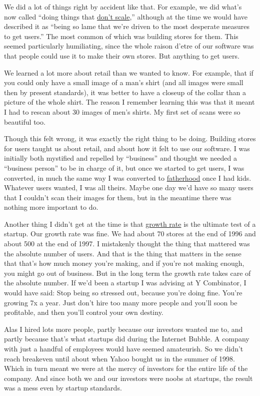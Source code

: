 We did a lot of things right by accident like that. For example, we did
what's now called ``doing things that \href{ds.html}{don't scale},''
although at the time we would have described it as ``being so lame that
we're driven to the most desperate measures to get users.'' The most
common of which was building stores for them. This seemed particularly
humiliating, since the whole raison d'etre of our software was that
people could use it to make their own stores. But anything to get users.

We learned a lot more about retail than we wanted to know. For example,
that if you could only have a small image of a man's shirt (and all
images were small then by present standards), it was better to have a
closeup of the collar than a picture of the whole shirt. The reason I
remember learning this was that it meant I had to rescan about 30 images
of men's shirts. My first set of scans were so beautiful too.

Though this felt wrong, it was exactly the right thing to be doing.
Building stores for users taught us about retail, and about how it felt
to use our software. I was initially both mystified and repelled by
``business'' and thought we needed a ``business person'' to be in charge
of it, but once we started to get users, I was converted, in much the
same way I was converted to \href{kids.html}{fatherhood} once I had
kids. Whatever users wanted, I was all theirs. Maybe one day we'd have
so many users that I couldn't scan their images for them, but in the
meantime there was nothing more important to do.

Another thing I didn't get at the time is that \href{growth.html}{growth
rate} is the ultimate test of a startup. Our growth rate was fine. We
had about 70 stores at the end of 1996 and about 500 at the end of 1997.
I mistakenly thought the thing that mattered was the absolute number of
users. And that is the thing that matters in the sense that that's how
much money you're making, and if you're not making enough, you might go
out of business. But in the long term the growth rate takes care of the
absolute number. If we'd been a startup I was advising at Y Combinator,
I would have said: Stop being so stressed out, because you're doing
fine. You're growing 7x a year. Just don't hire too many more people and
you'll soon be profitable, and then you'll control your own destiny.

Alas I hired lots more people, partly because our investors wanted me
to, and partly because that's what startups did during the Internet
Bubble. A company with just a handful of employees would have seemed
amateurish. So we didn't reach breakeven until about when Yahoo bought
us in the summer of 1998. Which in turn meant we were at the mercy of
investors for the entire life of the company. And since both we and our
investors were noobs at startups, the result was a mess even by startup
standards.

